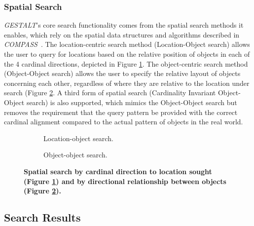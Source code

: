 \subsubsection{\textbf{Spatial Search}}
\emph{GESTALT}'s core search functionality comes from the spatial search methods it enables, which rely on the spatial data structures and algorithms described in \emph{COMPASS}~\cite{Osul2023}.
The location-centric search method (Location-Object search) allows the user to query for locations based on the relative position of objects in each of the 4 cardinal directions, depicted in Figure \ref{fig:spatial_search_loc}.
The object-centric search method (Object-Object search) allows the user to specify the relative layout of objects concerning each other, regardless of where they are relative to the location under search (Figure \ref{fig:spatial_search_obj}.
A third form of spatial search (Cardinality Invariant Object-Object search) is also supported, which mimics the Object-Object search but removes the requirement that the query pattern be provided with the correct cardinal alignment compared to the actual pattern of objects in the real world.


\begin{figure}[h]
    \centering
    \begin{subfigure}[t]{.2\textwidth}
        
        \caption{\small Location-object search.} 
        \label{fig:spatial_search_loc}
    \end{subfigure}
    \hfill
    \begin{subfigure}[t]{.2\textwidth}
        
        \caption{\small Object-object search.} 
        \label{fig:spatial_search_obj}
    \end{subfigure}
    \hfill
    \caption{\textbf{Spatial search by cardinal direction to location sought (Figure \ref{fig:spatial_search_loc}) and by directional relationship between objects (Figure \ref{fig:spatial_search_obj}).}}\label{figure:spatial_search} 
\end{figure}
\normalsize


\subsection{Search Results}

